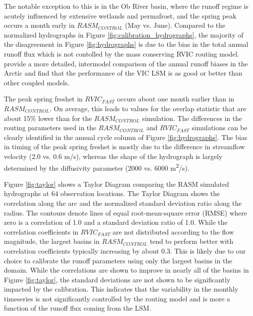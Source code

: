 \documentclass[jgrga, draft]{agutex}
\begin{document}
\begin{article}
The notable exception to this is in the Ob River basin, where the runoff regime is acutely influenced by extensive wetlands and permafrost, and the spring peak occurs a month early in $RASM_{CONTROL}$ (May vs. June).
Compared to the normalized hydrographs in Figure \ref{fig:calibration_hydrographs}, the majority of the disagreement in Figure \ref{fig:hydrographs} is due to the bias in the total annual runoff flux which is not contolled by the mass conserving RVIC routing model.
\citet{Hamman_2016} provide a more detailed, intermodel comparison of the annual runoff biases in the Arctic and find that the performance of the VIC LSM is as good or better than other coupled models.

The peak spring freshet in $RVIC_{FAST}$ occurs about one month earlier than in $RASM_{CONTROL}$.
On average, this leads to values for the overlap statistic that are about 15\% lower than for the $RASM_{CONTROL}$ simulation.
The differences in the routing parameters used in the $RASM_{CONTROL}$ and $RVIC_{FAST}$ simulations can be clearly identified in the annual cycle column of Figure \ref{fig:hydrographs}.
The bias in timing of the peak spring freshet is mostly due to the difference in streamflow velocity (2.0 vs. 0.6 m/s), whereas the shape of the hydrograph is largely determined by the diffusivity parameter (2000 vs. 6000 m\textsuperscript{2}/s).

Figure \ref{fig:taylor} shows a Taylor Diagram comparing the RASM simulated hydrographs at 64 observation locations.
The Taylor Diagram shows the correlation along the arc and the normalized standard deviation ratio along the radius.
The contours denote lines of equal root-mean-square error (RMSE) where zero is a correlation of 1.0 and a standard deviation ratio of 1.0. %
While the correlation coefficients in $RVIC_{FAST}$ are not distributed according to the flow magnitude, the largest basins in $RASM_{CONTROL}$ tend to perform better with correlation coefficients typically increasing by about 0.3.
This is likely due to our choice to calibrate the runoff parameters using only the largest basins in the domain. %
While the correlations are shown to improve in nearly all of the basins in Figure \ref{fig:taylor}, the standard deviations are not shown to be significantly impacted by the calibration.
This indicates that the variability in the monthly timeseries is not significantly controlled by the routing model and is more a function of the runoff flux coming from the LSM.


\end{article}
\end{document}
